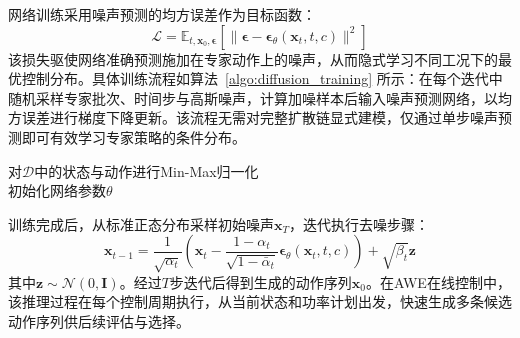 网络训练采用噪声预测的均方误差作为目标函数：
\begin{equation}
  \mathcal{L} = \mathbb{E}_{t, \mathbf{x}_0, \boldsymbol{\epsilon}} \left[ \| \boldsymbol{\epsilon} - \boldsymbol{\epsilon}_\theta(\mathbf{x}_t, t, c) \|^2 \right]
\end{equation}
该损失驱使网络准确预测施加在专家动作上的噪声，从而隐式学习不同工况下的最优控制分布。具体训练流程如算法~\ref{algo:diffusion_training} 所示：在每个迭代中随机采样专家批次、时间步与高斯噪声，计算加噪样本后输入噪声预测网络，以均方误差进行梯度下降更新。该流程无需对完整扩散链显式建模，仅通过单步噪声预测即可有效学习专家策略的条件分布。

\begin{algorithm}[htb]
  \caption{TCN Diffusion训练流程}
  \label{algo:diffusion_training}
  \SetAlgoLined
  对$\mathcal{D}$中的状态与动作进行Min-Max归一化\\
  初始化网络参数$\theta$\\
  \Return{$\theta$}
\end{algorithm}

训练完成后，从标准正态分布采样初始噪声$\mathbf{x}_T$，迭代执行去噪步骤：
\begin{equation}
  \mathbf{x}_{t-1} = \frac{1}{\sqrt{\alpha_t}}\left(\mathbf{x}_t - \frac{1-\alpha_t}{\sqrt{1-\bar{\alpha}_t}}\boldsymbol{\epsilon}_\theta(\mathbf{x}_t, t, c)\right) + \sqrt{\beta_t}\mathbf{z}
\end{equation}
其中$\mathbf{z} \sim \mathcal{N}(0, \mathbf{I})$。经过$T$步迭代后得到生成的动作序列$\mathbf{x}_0$。在AWE在线控制中，该推理过程在每个控制周期执行，从当前状态和功率计划出发，快速生成多条候选动作序列供后续评估与选择。

